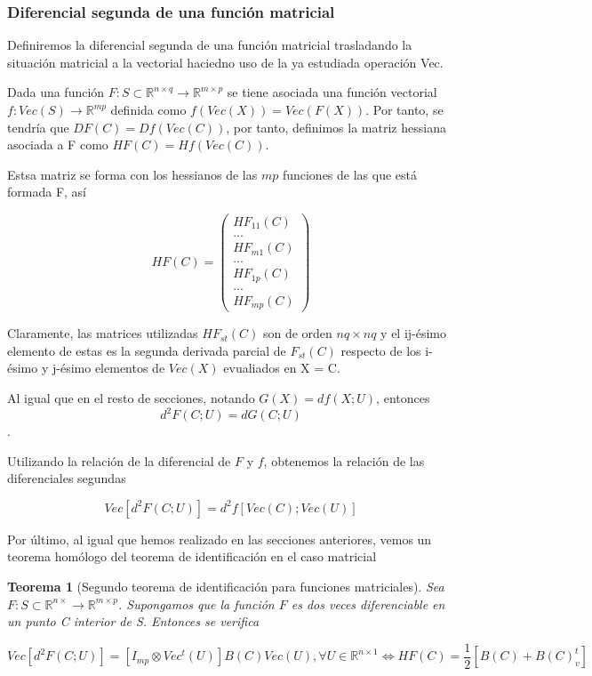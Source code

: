 \documentclass{article}
\theoremstyle{theorem-style}  %
\newtheorem{theorem}{Teorema}[section]  %
\theoremstyle{definition-style}
\theoremstyle{example-style}
\theoremstyle{exercise-style}
\begin{document}
	\subsubsection{Diferencial segunda de una función matricial}
	
	Definiremos la diferencial segunda de una función matricial trasladando la situación matricial a la vectorial haciedno uso de la ya estudiada operación Vec.
	
	Dada una función $F: S \subset \mathbb{R}^{n \times q} \rightarrow \mathbb{R}^{m \times p}$ se tiene asociada una función vectorial $f: Vec(S) \rightarrow \mathbb{R}^{mp}$ definida como $f(Vec(X)) = Vec(F(X))$. Por tanto, se tendría que $DF(C) = Df(Vec(C))$, por tanto, definimos la  matriz hessiana asociada a F como $HF(C) = Hf(Vec(C))$.
	
	Estsa matriz se forma con los hessianos de las $mp$ funciones de las que está formada F, así
	
	$$HF(C) = \left({\begin{array}{c}
		HF_{11}(C)\\
		...\\
		HF_{m1}(C)\\
		...\\
		HF_{1p}(C)\\
		...\\
		HF_{mp}(C)
		\end{array} } \right)$$
	
	
	Claramente, las matrices utilizadas $H F_{st}(C)$ son de orden $nq \times nq$ y el ij-ésimo elemento de estas es la segunda derivada parcial de $F_{st}(C)$ respecto de los i-ésimo y j-ésimo elementos de $Vec(X)$ evualiados en X = C.
	
	Al igual que en el resto de secciones, notando $G(X) = df(X;U)$, entonces $$d^2 F(C;U) = dG(C;U)$$.
	
	Utilizando la relación de la diferencial de $F$ y $f$, obtenemos la relación de las diferenciales segundas
	
	
	$$ Vec[d^2 F(C;U)] = d^2 f[Vec(C); Vec(U)]$$
	
	Por último, al igual que hemos realizado en las secciones anteriores, vemos un teorema homólogo del teorema de identificación en el caso matricial
	
	\begin{theorem}[Segundo teorema de identificación para funciones matriciales]	
		Sea $F: S \subset \mathbb{R}^{n \times } \rightarrow \mathbb{R}^{m \times p}$. Supongamos que la función $F$ es dos veces diferenciable en un punto C interior de S. Entonces se verifica
		
		$$ Vec[d^2 F(C;U)] = [I_{mp} \otimes Vec^t(U)]B(C) Vec(U), \forall U \in \mathbb{R}^{n \times 1} \iff HF(C) = \frac{1}{2} [B(C) + B(C)^t_v]$$
		
	\end{theorem}
	
\end{document}

